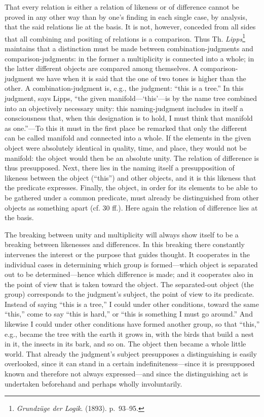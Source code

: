 \documentclass[12pt,a4paper]{book}
\newcommand{\opage}[1]{\marginnote{\footnotesize\textit{[#1]}}}
\begin{document}
That every relation is either a relation of likeness or of difference cannot
be proved in any other way than by one's finding in each single case, by
analysis, that the said relations lie at the basis. It is not, however,
conceded from all sides that all combining and positing of relations is a
comparison. Thus Th. \emph{Lipps}\footnote{\emph{Grundzüge der Logik}.
(1893). p.~93--95.} maintains that a distinction must be made between
combination-judgments and comparison-judgments: in the former a multiplicity
is connected into a whole; in the latter different objects are compared among
themselves. A comparison-judgment we have when it is said that the one of two
tones is higher than the other. A combination-judgment is, e.g., the
judgment: ``this is a tree.'' In this judgment, says Lipps, ``the given
manifold---`this'---is by the name tree combined into an objectively
necessary unity: this naming-judgment includes in itself a consciousness
that, when this designation is to hold, I must think that manifold as
one.''---To this it must in the first place be remarked that only the
different can be called manifold and connected into a whole. If the elements
in the given object were absolutely identical in quality, time, and place,
they would not be manifold: the object would then be an absolute unity. The
relation of difference is thus presupposed. Next, there lies in the naming
itself a presupposition of likeness between the object (``this'') and other
objects, and it is this likeness that the predicate expresses. Finally, the
object, in order for its elements to be able to be gathered under a common
predicate, must already be distinguished from other objects as something
apart (cf. 30 ff.). Here again the relation of difference lies at the basis.

The breaking between unity and multiplicity will always show itself to be a
breaking between likenesses and differences. In this breaking there
constantly intervenes the interest or the purpose that guides thought. It
cooperates in the individual cases in determining which group is
formed---which object is separated out to be determined---hence \opage{162}which
difference is made; and it cooperates also in the point of view that is taken
toward the object. The separated-out object (the group) corresponds to the
judgment's subject, the point of view to its predicate. Instead of saying
``this is a tree,'' I could under other conditions, toward the same ``this,''
come to say ``this is hard,'' or ``this is something I must go around.'' And
likewise I could under other conditions have formed another group, so that
``this,'' e.g., became the tree with the earth it grows in, with the birds
that build a nest in it, the insects in its bark, and so on. The object then
became a whole little world. That already the judgment's subject presupposes
a distinguishing is easily overlooked, since it can stand in a certain
indefiniteness---since it is presupposed known and therefore not always
expressed---and since the distinguishing act is undertaken beforehand and
perhaps wholly involuntarily.
\end{document}
